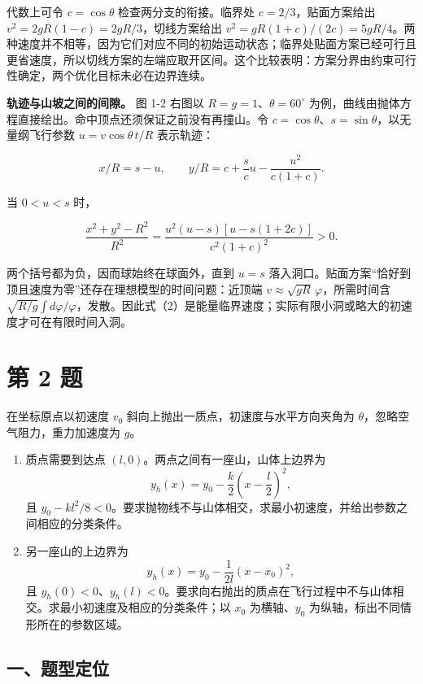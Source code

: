 \documentclass[12pt,a4paper,UTF8]{ctexart}
\newcommand{\tightlist}{\setlength{\itemsep}{0pt}\setlength{\parskip}{0pt}}
\begin{document}
代数上可令 \(c=\cos\theta\) 检查两分支的衔接。临界处
\(c=2/3\)，贴面方案给出 \(v^2=2gR(1-c)=2gR/3\)，切线方案给出
\(v^2=gR(1+c)/(2c)=5gR/4\)。两种速度并不相等，因为它们对应不同的初始运动状态；临界处贴面方案已经可行且更省速度，所以切线方案的左端应取开区间。这个比较表明：方案分界由约束可行性确定，两个优化目标未必在边界连续。

\textbf{轨迹与山坡之间的间隙。} 图 1-2 右图以
\(R=g=1\)、\(\theta=60^\circ\)
为例，曲线由抛体方程直接绘出。命中顶点还须保证之前没有再撞山。令
\(c=\cos\theta\)、\(s=\sin\theta\)，以无量纲飞行参数
\(u=v\cos\theta\,t/R\) 表示轨迹：

\[x/R=s-u,\qquad y/R=c+\frac{s}{c}u-\frac{u^2}{c(1+c)}.\]

当 \(0<u<s\) 时，

\[\frac{x^2+y^2-R^2}{R^2}=\frac{u^2(u-s)[u-s(1+2c)]}{c^2(1+c)^2}>0.\]

两个括号都为负，因而球始终在球面外，直到 \(u=s\)
落入洞口。贴面方案``恰好到顶且速度为零''还存在理想模型的时间问题：近顶端
\(v\approx\sqrt{gR}\,\varphi\)，所需时间含
\(\sqrt{R/g}\int d\varphi/\varphi\)，发散。因此式（2）是能量临界速度；实际有限小洞或略大的初速度才可在有限时间入洞。

\newpage

\section{第 2 题}\label{ux7b2c-2-ux9898}

在坐标原点以初速度 \(v_0\) 斜向上抛出一质点，初速度与水平方向夹角为
\(\theta\)，忽略空气阻力，重力加速度为 \(g\)。

\begin{enumerate}
\def\labelenumi{\arabic{enumi}.}
\tightlist
\item
  质点需要到达点 \((l,0)\)。两点之间有一座山，山体上边界为
  \[y_h(x)=y_0-\frac{k}{2}\left(x-\frac l2\right)^2,\] 且
  \(y_0-kl^2/8<0\)。要求抛物线不与山体相交，求最小初速度，并给出参数之间相应的分类条件。
\item
  另一座山的上边界为 \[y_h(x)=y_0-\frac{1}{2l}(x-x_0)^2,\] 且
  \(y_h(0)<0\)、\(y_h(l)<0\)。要求向右抛出的质点在飞行过程中不与山体相交。求最小初速度及相应的分类条件；以
  \(x_0\) 为横轴、\(y_0\) 为纵轴，标出不同情形所在的参数区域。
\end{enumerate}

\subsection{一、题型定位}\label{ux4e00ux9898ux578bux5b9aux4f4d-1}
\end{document}
